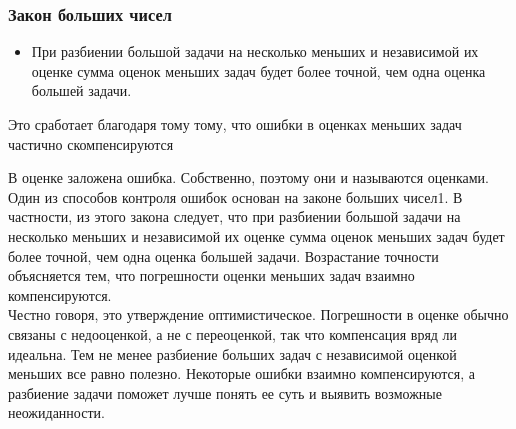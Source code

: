 \documentclass{../industrial-development}
\begin{document}
\begin{frame} \frametitle{Закон больших чисел}
\begin{itemize}
  \item При разбиении большой задачи на несколько меньших и независимой их оценке сумма оценок меньших задач будет более точной, чем одна оценка большей задачи.
\end{itemize}
Это сработает благодаря тому тому, что ошибки в оценках меньших задач частично скомпенсируются
\end{frame}
\lecturenotes
В оценке заложена ошибка. Собственно, поэтому они и называются оценками. Один из способов контроля ошибок основан на законе больших чисел1. В частности, из этого закона следует, что при разбиении большой задачи на несколько меньших и независимой их оценке сумма оценок меньших задач будет более точной, чем одна оценка большей задачи. Возрастание точности объясняется тем, что погрешности оценки меньших задач взаимно компенсируются.\\
Честно говоря, это утверждение оптимистическое. Погрешности в оценке обычно связаны с недооценкой, а не с переоценкой, так что компенсация вряд ли идеальна. Тем не менее разбиение больших задач с независимой оценкой меньших все равно полезно. Некоторые ошибки взаимно компенсируются, а разбиение задачи поможет лучше понять ее суть и выявить возможные неожиданности.
\end{document}
